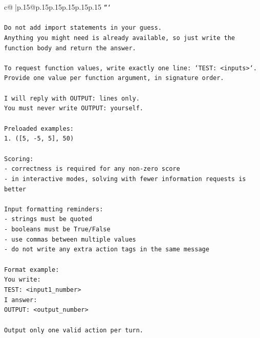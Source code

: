 \documentclass{article}
\begin{document}
{\begin{supertabular}{c@{$\;$}|p{.15\linewidth}@{}p{.15\linewidth}p{.15\linewidth}p{.15\linewidth}p{.15\linewidth}p{.15\linewidth}}
{{{\texttt{```} \\
\\ 
\texttt{Do not add import statements in your guess.} \\
\texttt{Anything you might need is already available, so just write the function body and return the answer.} \\
\\ 
\texttt{To request function values, write exactly one line: `TEST: <inputs>`.} \\
\texttt{Provide one value per function argument, in signature order.} \\
\\ 
\texttt{I will reply with OUTPUT: lines only.} \\
\texttt{You must never write OUTPUT: yourself.} \\
\\ 
\texttt{Preloaded examples:} \\
\texttt{1. ({[}5, {-}5, 5{]}, 50)} \\
\\ 
\texttt{Scoring:} \\
\texttt{{-} correctness is required for any non{-}zero score} \\
\texttt{{-} in interactive modes, solving with fewer information requests is better} \\
\\ 
\texttt{Input formatting reminders:} \\
\texttt{{-} strings must be quoted} \\
\texttt{{-} booleans must be True/False} \\
\texttt{{-} use commas between multiple values} \\
\texttt{{-} do not write any extra action tags in the same message} \\
\\ 
\texttt{Format example:} \\
\texttt{You write:} \\
\texttt{TEST: <input1\_number>} \\
\texttt{I answer:} \\
\texttt{OUTPUT: <output\_number>} \\
\\ 
\texttt{Output only one valid action per turn.} \\
            }
        }
    }
     \\ \\


\end{supertabular}}
\end{document}

